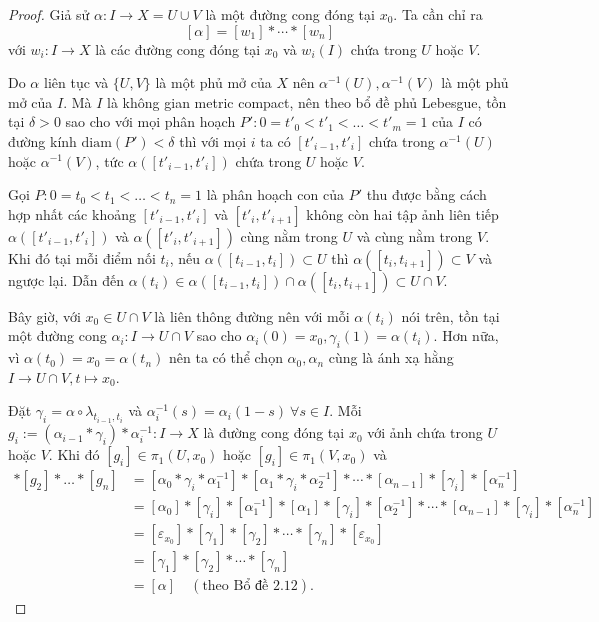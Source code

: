 \begin{proof}
    Giả sử $\alpha:I\to X=U\cup V$ là một đường cong đóng tại $x_0$. Ta cần chỉ ra 
    \[[\alpha]=[w_1]*\cdots*[w_n]\] 
    với $w_i:I\to X$ là các đường cong đóng tại $x_0$ và $w_i(I)$ chứa trong $U$ hoặc $V$. 

    Do $\alpha$ liên tục và $\{U,V\}$ là một phủ mở của $X$ nên $\alpha^{-1}(U), \alpha^{-1}(V)$ là một phủ mở của $I$. Mà $I$ là không gian metric compact, nên theo bổ đề phủ Lebesgue, tồn tại $\delta>0$ sao cho với mọi phân hoạch $P': 0=t'_0<t'_1<\ldots<t'_m=1$ của $I$ có đường kính $\text{diam}(P') <\delta$ thì với mọi $i$ ta có $[t'_{i-1},t'_i]$ chứa trong $\alpha^{-1}(U)$ hoặc $\alpha^{-1}(V)$, tức $\alpha([t'_{i-1},t'_i])$ chứa trong $U$ hoặc $V$. 
    
    Gọi $P:0=t_0<t_1<\ldots<t_n=1$ là phân hoạch con của $P'$ thu được bằng cách hợp nhất các khoảng $[t'_{i-1},t'_i]$ và $[t'_i,t'_{i+1}]$ không còn hai tập ảnh liên tiếp $\alpha([t'_{i-1},t'_i])$ và $\alpha([t'_{i},t'_{i+1}])$ cùng nằm trong $U$ và cùng nằm trong $V$. Khi đó tại mỗi điểm nối $t_i$, nếu $\alpha([t_{i-1},t_i])\subset U$ thì $\alpha([t_i,t_{i+1}])\subset V$ và ngược lại. Dẫn đến $\alpha(t_i)\in \alpha([t_{i-1},t_i]) \cap \alpha([t_{i},t_{i+1}])\subset U\cap V$. 
    
    Bây giờ, với $x_0 \in U\cap V$ là liên thông đường nên với mỗi $\alpha(t_i)$ nói trên, tồn tại một đường cong $\alpha_i:I\to U\cap V$ sao cho $\alpha_i(0)=x_0, \gamma_i(1)=\alpha(t_i)$. Hơn nữa, vì $\alpha(t_0)=x_0=\alpha(t_n)$ nên ta có thể chọn $\alpha_0,\alpha_n$ cùng là ánh xạ hằng $I\to U\cap V, t\mapsto x_0$. 

    Đặt $\gamma_i = \alpha\circ \lambda_{t_{i-1},t_i}$ và $\alpha_i^{-1}(s)=\alpha_i(1-s)~\forall s\in I$. Mỗi $g_i:=(\alpha_{i-1}*\gamma_i)*\alpha_i^{-1}: I\to X$ là đường cong đóng tại $x_0$ với ảnh chứa trong $U$ hoặc $V$. Khi đó $[g_i]\in \pi_1(U,x_0)$ hoặc $[g_i]\in \pi_1(V,x_0)$ và 
    \begin{align*}
        [g_1]*[g_2]*\ldots*[g_n]
        &=[\alpha_{0}*\gamma_i*\alpha_1^{-1}]*[\alpha_{1}*\gamma_i*\alpha_2^{-1}]*\cdots*[\alpha_{n-1}]*[\gamma_i]*[\alpha_n^{-1}]\\
        &=[\alpha_{0}]*[\gamma_i]*[\alpha_1^{-1}]*[\alpha_{1}]*[\gamma_i]*[\alpha_2^{-1}]*\cdots*[\alpha_{n-1}]*[\gamma_i]*[\alpha_n^{-1}]\\
        &=[\varepsilon_{x_0}]*[\gamma_1]*[\gamma_2]*\cdots*[\gamma_n]*[\varepsilon_{x_0}]\\
        &=[\gamma_1]*[\gamma_2]*\cdots*[\gamma_n]\\
        &=[\alpha] \quad (\text{theo Bổ đề 2.12}).
    \end{align*}
\end{proof}
